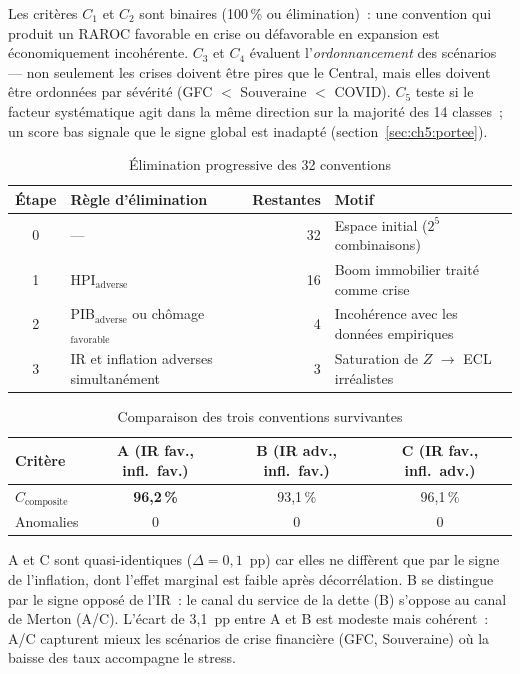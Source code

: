 \documentclass[10pt, a4paper, oneside]{report}
\theoremstyle{definition}
\begin{document}
Les critères $C_1$ et $C_2$ sont binaires (100\,\% ou élimination)~: une convention qui produit un RAROC favorable en crise ou défavorable en expansion est économiquement incohérente. $C_3$ et $C_4$ évaluent l'\emph{ordonnancement} des scénarios --- non seulement les crises doivent être pires que le Central, mais elles doivent être ordonnées par sévérité (GFC $<$ Souveraine $<$ COVID). $C_5$ teste si le facteur systématique agit dans la même direction sur la majorité des 14 classes~; un score bas signale que le signe global est inadapté (section~\ref{sec:ch5:portee}).

\begin{table}[htbp]
\centering
\caption{Élimination progressive des 32 conventions}
\label{tab:elimination}
\small
\begin{tabular}{clrl}
\toprule
Étape & Règle d'élimination & Restantes & Motif \\
\midrule
0 & --- & 32 & Espace initial ($2^5$ combinaisons) \\
1 & HPI$_{\text{adverse}}$ & 16 & Boom immobilier traité comme crise \\
2 & PIB$_{\text{adverse}}$ ou chômage$_{\text{favorable}}$ & 4 & Incohérence avec les données empiriques \\
3 & IR et inflation adverses simultanément & 3 & Saturation de $Z$ $\to$ ECL irréalistes \\
\bottomrule
\end{tabular}
\end{table}

\begin{table}[htbp]
\centering
\caption{Comparaison des trois conventions survivantes}
\label{tab:abc-compare}
\begin{tabular}{lccc}
\toprule
\textbf{Critère} & \textbf{A (IR fav., infl.\ fav.)} & \textbf{B (IR adv., infl.\ fav.)} & \textbf{C (IR fav., infl.\ adv.)} \\
\midrule
$C_{\text{composite}}$ & \textbf{96{,}2\,\%} & 93{,}1\,\% & 96{,}1\,\% \\
Anomalies & 0 & 0 & 0 \\
\bottomrule
\end{tabular}
\end{table}

A et C sont quasi-identiques ($\Delta = 0{,}1$~pp) car elles ne diffèrent que par le signe de l'inflation, dont l'effet marginal est faible après décorrélation. B se distingue par le signe opposé de l'IR~: le canal du service de la dette (B) s'oppose au canal de Merton (A/C). L'écart de 3{,}1~pp entre A et B est modeste mais cohérent~: A/C capturent mieux les scénarios de crise financière (GFC, Souveraine) où la baisse des taux accompagne le stress.
\end{document}
